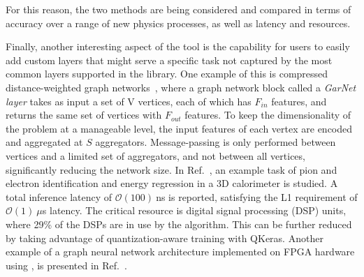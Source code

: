 For this reason, the two methods are being considered and compared in terms of accuracy over a range of new physics processes, as well as latency and resources.

Finally, another interesting aspect of the \hlsfml tool is the capability for users to easily add custom layers that might serve a specific task not captured by the most common layers supported in the library. One example of this is compressed distance-weighted graph networks~\cite{garnet}, where a graph network block called a \emph{GarNet layer} takes as input a set of V vertices, each of which has $F_{in}$ features, and returns the same set of vertices with $F_{out}$ features. 
To keep the dimensionality of the problem at a manageable level, the input features of each vertex are encoded and aggregated at $S$ aggregators. Message-passing is only performed between vertices and a limited set of aggregators, and not between all vertices, significantly reducing the network size. 
In Ref.~\cite{garnet}, an example task of pion and electron identification and energy regression in a 3D calorimeter is studied. 
A total inference latency of $\mathcal{O}(100)~$ns is reported, satisfying the L1 requirement of $\mathcal{O}(1)~\mu$s latency. 
The critical resource is digital signal processing (DSP) units, where 29\% of the DSPs are in use by the algorithm. 
This can be further reduced by taking advantage of quantization-aware training with QKeras. 
Another example of a graph neural network architecture implemented on FPGA hardware using \hlsfml, is presented in Ref.~\cite{heintz2020accelerated}. 
